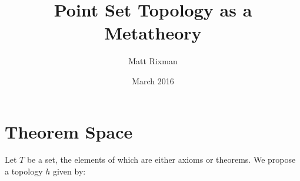 \documentclass{article}
\title{Point Set Topology as a Metatheory}
\author{Matt Rixman }
\date{March 2016}
\begin{document}
\maketitle

\section{Theorem Space}

Let \(T\) be a set, the elements of which are either axioms or theorems.
We propose a topology \(h\) given by:
\end{document}
